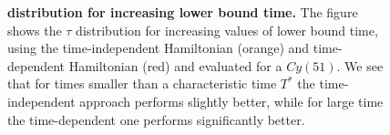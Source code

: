 \begin{figure}[!htb]
  \centering
  \caption{\textbf{\bm{$\tau$} distribution for increasing lower bound time. }The figure shows the $\tau$ distribution for increasing values of lower bound time, using the time-independent Hamiltonian (orange) and time-dependent Hamiltonian (red) and evaluated for a $Cy(51)$. We see that for times smaller than a characteristic time $T^*$ the time-independent approach performs slightly better, while for large time the time-dependent one performs significantly better.}
  \label{fig:tau_increasing_time}
\end{figure}
